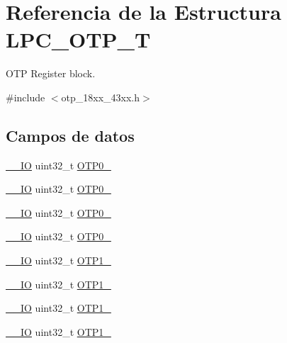 \hypertarget{struct_l_p_c___o_t_p___t}{}\section{Referencia de la Estructura L\+P\+C\+\_\+\+O\+T\+P\+\_\+T}
\label{struct_l_p_c___o_t_p___t}


O\+TP Register block.  




{\ttfamily \#include $<$otp\+\_\+18xx\+\_\+43xx.\+h$>$}

\subsection*{Campos de datos}
\begin{DoxyCompactItemize}
\item 
\hyperlink{core__sc300_8h_aec43007d9998a0a0e01faede4133d6be}{\+\_\+\+\_\+\+IO} uint32\+\_\+t \hyperlink{struct_l_p_c___o_t_p___t_aafa6e995289fe125b20424c76021729e}{O\+T\+P0\+\_}
\item 
\hyperlink{core__sc300_8h_aec43007d9998a0a0e01faede4133d6be}{\+\_\+\+\_\+\+IO} uint32\+\_\+t \hyperlink{struct_l_p_c___o_t_p___t_ad36305afed6bd8e8bdea47a45699fb7c}{O\+T\+P0\+\_}
\item 
\hyperlink{core__sc300_8h_aec43007d9998a0a0e01faede4133d6be}{\+\_\+\+\_\+\+IO} uint32\+\_\+t \hyperlink{struct_l_p_c___o_t_p___t_ac7fc5a04bb8766845ffdab36a3ef2152}{O\+T\+P0\+\_}
\item 
\hyperlink{core__sc300_8h_aec43007d9998a0a0e01faede4133d6be}{\+\_\+\+\_\+\+IO} uint32\+\_\+t \hyperlink{struct_l_p_c___o_t_p___t_aed395d3b6adea1f7a85a2ccf2d0b87e7}{O\+T\+P0\+\_}
\item 
\hyperlink{core__sc300_8h_aec43007d9998a0a0e01faede4133d6be}{\+\_\+\+\_\+\+IO} uint32\+\_\+t \hyperlink{struct_l_p_c___o_t_p___t_afabdebf1f1f83926dab2f2b1e15661c0}{O\+T\+P1\+\_}
\item 
\hyperlink{core__sc300_8h_aec43007d9998a0a0e01faede4133d6be}{\+\_\+\+\_\+\+IO} uint32\+\_\+t \hyperlink{struct_l_p_c___o_t_p___t_a8ebcb80290dc8278f137b023a6319420}{O\+T\+P1\+\_}
\item 
\hyperlink{core__sc300_8h_aec43007d9998a0a0e01faede4133d6be}{\+\_\+\+\_\+\+IO} uint32\+\_\+t \hyperlink{struct_l_p_c___o_t_p___t_a2a26be8e56a1e55f7aee987107586fe4}{O\+T\+P1\+\_}
\item 
\hyperlink{core__sc300_8h_aec43007d9998a0a0e01faede4133d6be}{\+\_\+\+\_\+\+IO} uint32\+\_\+t \hyperlink{struct_l_p_c___o_t_p___t_a11e4d14773e1237874863e191a627e4e}{O\+T\+P1\+\_}

\end{DoxyCompactItemize}
